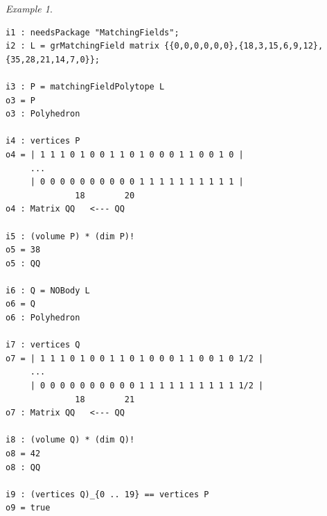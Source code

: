 \documentclass[11pt]{article}
\newcommand{\init}{\text{in}}
\theoremstyle{plain}
\theoremstyle{definition}
\theoremstyle{remark}
\newtheorem{example}[theorem]{Example}
\begin{document}
\begin{example}

\begin{lstlisting}[caption={Polyhedra associated $L$. The output \texttt{o4} and $\texttt{o7}$ have been trimmed for brevity. The output \texttt{o9} shows that the vertices of the Newton-Okounkov body $Q$ are the vertices of the matching field polytope $P$ together with one more vertex, which comes from a degree-$2$ generator of $\init_\prec(A)$.}]
i1 : needsPackage "MatchingFields";
i2 : L = grMatchingField matrix {{0,0,0,0,0,0},{18,3,15,6,9,12},{35,28,21,14,7,0}};

i3 : P = matchingFieldPolytope L
o3 = P
o3 : Polyhedron

i4 : vertices P
o4 = | 1 1 1 0 1 0 0 1 1 0 1 0 0 0 1 1 0 0 1 0 |
     ...
     | 0 0 0 0 0 0 0 0 0 0 1 1 1 1 1 1 1 1 1 1 |
              18        20
o4 : Matrix QQ   <--- QQ

i5 : (volume P) * (dim P)!
o5 = 38
o5 : QQ

i6 : Q = NOBody L
o6 = Q
o6 : Polyhedron

i7 : vertices Q
o7 = | 1 1 1 0 1 0 0 1 1 0 1 0 0 0 1 1 0 0 1 0 1/2 |
     ...
     | 0 0 0 0 0 0 0 0 0 0 1 1 1 1 1 1 1 1 1 1 1/2 |
              18        21
o7 : Matrix QQ   <--- QQ

i8 : (volume Q) * (dim Q)!
o8 = 42
o8 : QQ

i9 : (vertices Q)_{0 .. 19} == vertices P
o9 = true
\end{lstlisting}

\end{example}
\end{document}
